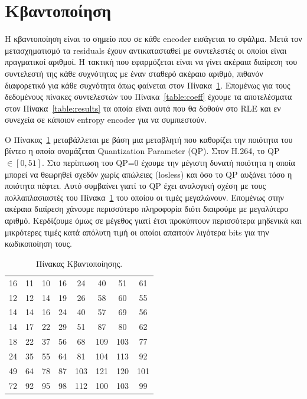 \newpage
\section{Κβαντοποίηση}
\label{section:sect25}

\indent Η κβαντοποίηση είναι το σημείο που σε κάθε encoder εισάγεται το σφάλμα. Μετά τον μετασχηματισμό τα residuals έχουν αντικατασταθεί με συντελεστές οι οποίοι είναι πραγματικοί αριθμοί. Η τακτική που εφαρμόζεται είναι να γίνει ακέραια διαίρεση του συντελεστή της κάθε συχνότητας με έναν σταθερό ακέραιο αριθμό, πιθανόν διαφορετικό για κάθε συχνότητα όπως φαίνεται στον Πίνακα~\ref{table:quanttable}. Επομένως για τους δεδομένους πίνακες συντελεστών του Πίνακα~\ref{table:coeff} έχουμε τα αποτελέσματα στον Πίνακα~\ref{table:results} τα οποία είναι αυτά που θα δοθούν στο RLE και εν συνεχεία σε κάποιον entropy encoder για να συμπιεστούν.

\indent Ο Πίνακας~\ref{table:quanttable} μεταβάλλεται με βάση μια μεταβλητή που καθορίζει την ποιότητα του βίντεο η οποία ονομάζεται Quantization Parameter (QP). Στον H.264, το QP $\in [0,51] $. Στο περίπτωση του QP=0 έχουμε την μέγιστη δυνατή ποιότητα η οποία μπορεί να θεωρηθεί σχεδόν χωρίς απώλειες (losless) και όσο το QP αυξάνει τόσο η ποιότητα πέφτει. Αυτό συμβαίνει γιατί το QP έχει αναλογική σχέση με τους πολλαπλασιαστές του Πίνακα~\ref{table:quanttable} του οποίου οι τιμές μεγαλώνουν. Επομένως στην ακέραια διαίρεση χάνουμε περισσότερο πληροφορία διότι διαιρούμε με μεγαλύτερο αριθμό. Κερδίζουμε όμως σε μέγεθος γιατί έτσι προκύπτουν περισσότερα μηδενικά και μικρότερες τιμές κατά απόλυτη τιμή οι οποίοι απαιτούν λιγότερα bits για την κωδικοποίηση τους.

\begin{table}[H]
    \begin{center}
        \begin{tabular}{| c  c  c  c  c  c  c  c |}
        \hline
        16 & 11 & 10 & 16 & 24 & 40 & 51 & 61 \\
        12 & 12 & 14 & 19 & 26 & 58 & 60 & 55 \\
        14 & 14 & 16 & 24 & 40 & 57 & 69 & 56 \\
        14 & 17 & 22 & 29 & 51 & 87 & 80 & 62 \\
        18 & 22 & 37 & 56 & 68 & 109 & 103 & 77 \\
        24 & 35 & 55 & 64 & 81 & 104 & 113 & 92 \\
        49 & 64 & 78 & 87 & 103 & 121 & 120 & 101 \\
        72 & 92 & 95 & 98 & 112 & 100 & 103 & 99 \\
        \hline
        \end{tabular}
    \end{center}
    \caption{Πίνακας Κβαντοποίησης. \cite{wiki:jpeg}}
    \label{table:quanttable}
\end{table}

